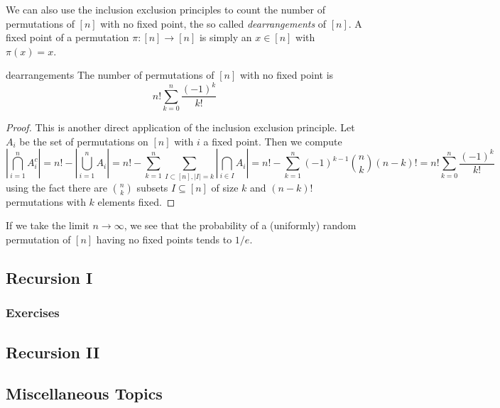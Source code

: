 \documentclass{article}
\newcounter{statementcount}
\begin{document}
We can also use the inclusion exclusion principles to count the number of permutations of $[n]$ with no fixed point, 
the so called {\it dearrangements} of $[n]$. A fixed point of a permutation $\pi:[n] \to [n]$ is simply an 
$x \in [n]$ with $\pi(x) = x$. 

\begin{proposition}[]{dearrangements}
    The number of permutations of $[n]$ with no fixed point is \[n!\sum_{k = 0}^n \frac{(-1)^k}{k!}\]
\end{proposition}

\begin{proof}
    This is another direct application of the inclusion exclusion principle. Let $A_i$ be the set of permutations 
    on $[n]$ with $i$ a fixed point. Then we compute
    \[
        \left|\bigcap_{i=1}^n A_i^c\right| = n! - \left|\bigcup_{i = 1}^n A_i\right| = n! - \sum_{k=1}^n
        \sum_{I \subset [n], |I| = k}\left|\bigcap_{i \in I}A_i\right| = n! - \sum_{k=1}^n (-1)^{k-1}\binom{n}{k}(n-k)! 
        = n! \sum_{k=0}^n \frac{(-1)^k}{k!}
    \]
    using the fact there are $\binom{n}{k}$ subsets $I \subseteq [n]$ of size $k$ and $(n-k)!$ permutations 
    with $k$ elements fixed. 
\end{proof}

If we take the limit $n \to \infty$, we see that the probability of a (uniformly) random permutation of $[n]$ having
no fixed points tends to $1/e$. 

\newpage

\subsection{Recursion I}

\setcounter{statementcount}{1}

\subsubsection*{Exercises}

\newpage

\subsection{Recursion II}

\setcounter{statementcount}{1}

\newpage 

\subsection{Miscellaneous Topics}
\end{document}
